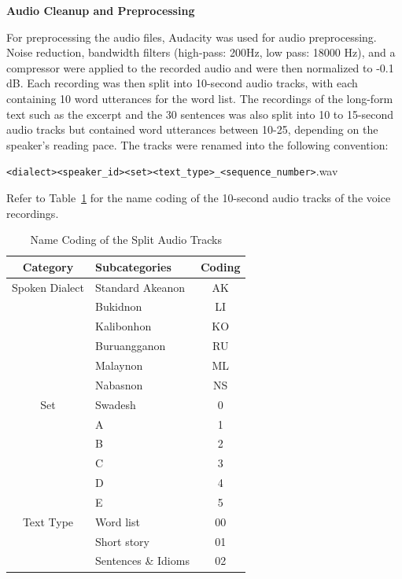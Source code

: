 \textbf{Audio Cleanup and Preprocessing}

For preprocessing the audio files, Audacity was used for audio preprocessing. Noise reduction, bandwidth filters (high-pass: 200Hz, low pass: 18000 Hz), and a compressor were applied to the recorded audio and were then normalized to -0.1 dB. Each recording was then split into 10-second audio tracks, with each containing 10 word utterances for the word list. The recordings of the long-form text such as the excerpt and the 30 sentences was also split into 10 to 15-second audio tracks but contained word utterances between 10-25, depending on the speaker's reading pace. The tracks were renamed into the following convention:

\texttt{\textless dialect\textgreater\textless speaker\_id\textgreater\textless set\textgreater\textless text\_type\textgreater\_\textless sequence\_number\textgreater}.wav

Refer to Table~\ref{tab:namecoding} for the name coding of the 10-second audio tracks of the voice recordings.

\begin{table}[H]
   \centering
   \caption{Name Coding of the Split Audio Tracks} \vspace{0.25em}
   \label{tab:namecoding}
   
   \renewcommand{\arraystretch}{1.5} %
   \setlength{\tabcolsep}{10pt} %
   
   \begin{tabular}{|c|p{2in}|c|}
   \hline
   \textbf{Category} & \textbf{Subcategories} & \textbf{Coding} \\
   \hline
   Spoken Dialect & Standard Akeanon & AK \\ 
   & Bukidnon & LI \\ 
   & Kalibonhon & KO \\ 
   & Buruangganon & RU \\ 
   & Malaynon & ML \\ 
   & Nabasnon & NS \\
   \hline
   Set & Swadesh & 0 \\ 
   & A & 1 \\ 
   & B & 2 \\ 
   & C & 3 \\ 
   & D & 4 \\  
   & E & 5 \\ 
   \hline
   Text Type & Word list & 00 \\ 
   & Short story & 01 \\ 
   & Sentences \& Idioms & 02 \\ 
   \hline
   \end{tabular}
\end{table}
   
